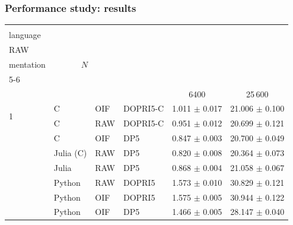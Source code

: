 \documentclass[
  10pt,
  aspectratio=169,
  english,
  onlytextwidth,  %
]{beamer}
\begin{document}
\begin{frame}
  \frametitle{Performance study: results}

  \newcommand{\myheader}{%
    \headerWithBreaks{0.2em}{\#} &
    \headerWithBreaks{3em}{User\\language} &
    \headerWithBreaks{1.5em}{OIF/\\RAW} &
    \headerWithBreaks{3em}{Imple-\\mentation} &
    \multicolumn{2}{c}{$N$} \\
    \cmidrule(lr){5-6}
  }
  \vspace{1em}
  \centering
  \begin{tabular}{l l l l c c}
    \toprule
    \myheader                                                                                    \\
                       &           &     &          & 6400                & 25\,600              \\
    \midrule
    \multirow{2}{*}{1} & C         & OIF & DOPRI5-C & 1.011 \(\pm\) 0.017 & 21.006 \(\pm\) 0.100 \\
                       & C         & RAW & DOPRI5-C & 0.951 \(\pm\) 0.012 & 20.699 \(\pm\) 0.121 \\
    \addlinespace
    \addlinespace
    \multirow{3}{*}{2} & C         & OIF & DP5      & 0.847 \(\pm\) 0.003 & 20.700 \(\pm\) 0.049 \\
                       & Julia (C) & RAW & DP5      & 0.820 \(\pm\) 0.008 & 20.364 \(\pm\) 0.073 \\
                       & Julia     & RAW & DP5      & 0.868 \(\pm\) 0.004 & 21.058 \(\pm\) 0.067 \\
    \addlinespace
    \addlinespace
    \multirow{3}{*}{3} & Python    & RAW & DOPRI5   & 1.573 \(\pm\) 0.010 & 30.829 \(\pm\) 0.121 \\
                       & Python    & OIF & DOPRI5   & 1.575 \(\pm\) 0.005 & 30.944 \(\pm\) 0.122 \\
                       & Python    & OIF & DP5      & 1.466 \(\pm\) 0.005 & 28.147 \(\pm\) 0.040 \\
    \bottomrule
  \end{tabular}
\end{frame}
\end{document}
